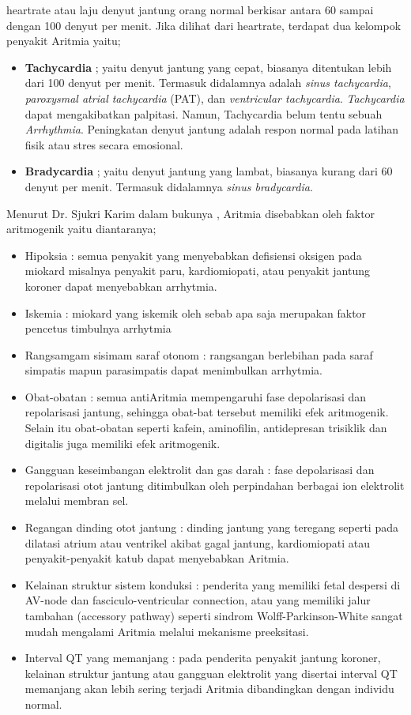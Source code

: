 \Gls{heartrate} atau laju denyut jantung orang normal berkisar
antara 60 sampai dengan 100 denyut per menit\cite{medicinenet.2}. Jika dilihat
dari \gls{heartrate}, terdapat dua kelompok penyakit Aritmia yaitu;
\begin{itemize}
	\item \textbf{Tachycardia} ; yaitu denyut jantung yang cepat, biasanya
	ditentukan lebih dari 100 denyut per menit. Termasuk didalamnya adalah 
	\textit{sinus tachycardia}, \textit{paroxysmal atrial tachycardia} (PAT), dan
	\textit{ventricular tachycardia}. \textit{Tachycardia}  dapat mengakibatkan
	\gls{palpitasi}. Namun, Tachycardia belum tentu sebuah 	\textit{Arrhythmia}.
	Peningkatan denyut jantung adalah respon  normal pada latihan fisik atau stres
	secara emosional.

	\item \textbf{Bradycardia} ; yaitu denyut jantung yang lambat, biasanya kurang
	dari 60 denyut per menit. Termasuk didalamnya \textit{sinus bradycardia}.
\end{itemize}
 
Menurut Dr. Sjukri Karim dalam bukunya \cite{Karim:1996}, Aritmia
disebabkan oleh faktor aritmogenik yaitu diantaranya;
\begin{itemize}
  \item Hipoksia : semua penyakit yang menyebabkan defisiensi oksigen pada
  miokard misalnya penyakit paru, kardiomiopati, atau penyakit jantung koroner
  dapat menyebabkan \gls{arrhytmia}.
  \item Iskemia : miokard yang iskemik oleh sebab apa saja merupakan faktor
  pencetus timbulnya \gls{arrhytmia}
  \item Rangsamgam sisimam saraf otonom : rangsangan berlebihan pada saraf
  simpatis mapun parasimpatis dapat menimbulkan \gls{arrhytmia}.
  \item Obat-obatan : semua antiAritmia mempengaruhi fase depolarisasi dan
  repolarisasi jantung, sehingga obat-bat tersebut memiliki efek aritmogenik.
  Selain itu obat-obatan seperti kafein, aminofilin, antidepresan trisiklik dan
  digitalis juga memiliki efek aritmogenik.
  \item Gangguan keseimbangan elektrolit dan gas darah : fase depolarisasi dan
  repolarisasi otot jantung ditimbulkan oleh perpindahan berbagai ion elektrolit
  melalui membran sel.
  \item Regangan dinding otot jantung : dinding jantung yang teregang seperti
  pada dilatasi atrium atau ventrikel akibat gagal jantung, kardiomiopati atau
  penyakit-penyakit katub dapat menyebabkan Aritmia.
  \item Kelainan struktur sistem konduksi : penderita yang memiliki fetal
  despersi di AV-node dan fasciculo-ventricular connection, atau yang memiliki
  jalur tambahan (accessory pathway) seperti sindrom Wolff-Parkinson-White
  sangat mudah mengalami Aritmia melalui mekanisme preeksitasi.
  \item Interval QT yang memanjang : pada penderita penyakit jantung koroner,
  kelainan struktur jantung atau gangguan elektrolit yang disertai interval QT
  memanjang akan lebih sering terjadi Aritmia dibandingkan dengan individu
  normal.
\end{itemize} 

